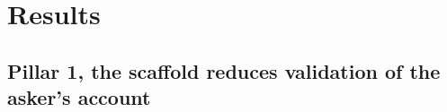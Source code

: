 \providecommand{\todo}[1]{\textbf{[TODO: #1]}}

\section{Results}
\label{sec-results-unified}

\subsection{Pillar 1, the scaffold reduces validation of the asker's account}
\label{sec-results-pillar1}

\begin{table}[t]
\centering
\small

\caption{Validation of the asker's account on 150 open-ended dilemmas, scored
from the complete response. Drop is the scaffold minus the control in
points with an item-clustered 95 percent interval. Relative is the drop
over the control rate. Bracket bounds the drop over responses an arm did
not return. Length-matched restricts both arms to responses of the same
length where the arms share support, with the number of responses used.}
\label{tab-pillar1}
\end{table}

